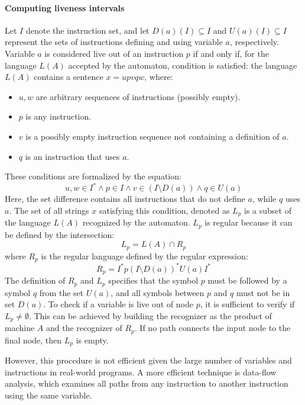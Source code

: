 \paragraph*{Computing liveness intervals}
Let $I$ denote the instruction set, and let $D(a)(I) \subseteq I$ and $U(a)(I) \subseteq I$ represent the sets of instructions defining and using variable $a$, respectively.
Variable $a$ is considered live out of an instruction $p$ if and only if, for the language $L(A)$ accepted by the automaton, condition is satisfied:
the language $L(A)$ contains a sentence $x = u p v q w$, where:
\begin{itemize}
    \item $u, w$ are arbitrary sequences of instructions (possibly empty). 
    \item $p$ is any instruction. 
    \item $v$ is a possibly empty instruction sequence not containing a definition of $a$. 
    \item $q$ is an instruction that uses $a$. 
\end{itemize}
These conditions are formalized by the equation:
\[ u, w \in I^{*} \land p \in I \land v \in \left( I \setminus D\left( a \right) \right) \land q \in U\left( a \right) \]
Here, the set difference contains all instructions that do not define $a$, while $q$ uses $a$.
The set of all strings $x$ satisfying this condition, denoted as $L_p$ is a subset of the language $L(A)$ recognized by the automaton.
$L_p$  is regular because it can be defined by the intersection:
\[ L_p = L(A) \cap R_p \]
where $R_p$ is the regular language defined by the regular expression:
\[ R_p = I^{*} p \left( I \setminus D \left( a \right) \right)^{*} U \left( a \right) I^{*} \]
The definition of $R_p$ and $L_p$ specifies that the symbol $p$ must be followed by a symbol $q$ from the set $U\left( a \right)$, and all symbols between $p$ and $q$ must not be in set $D\left( a \right)$.
To check if a variable is live out of node $p$, it is sufficient to verify if $L_p \neq \emptyset$. 
This can be achieved by building the recognizer as the product of machine $A$ and the recognizer of $R_p$.
If no path connects the input node to the final node, then $L_p$ is empty.

However, this procedure is not efficient given the large number of variables and instructions in real-world programs. 
A more efficient technique is data-flow analysis, which examines all paths from any instruction to another instruction using the same variable.

